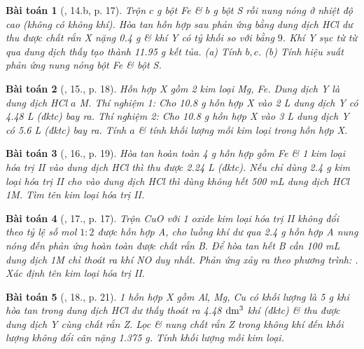 \documentclass{article}
\newtheorem{baitoan}{Bài toán}
\begin{document}
\begin{baitoan}[\cite{An_350_BT_Hoa_Hoc_9}, 14.b, p. 17]
	Trộn $c$ \emph{g} bột \emph{Fe} \& $b$ \emph{g} bột \emph{S} rồi nung nóng ở nhiệt độ cao (không có không khí). Hòa tan hỗn hợp sau phản ứng bằng dung dịch \emph{HCl} dư thu được chất rắn X nặng \emph{0.4 g} \& khí Y có tỷ khối so với \emph{} bằng $9$. Khí Y sục từ từ qua dung dịch \emph{} thấy tạo thành \emph{11.95 g} kết tủa. (a) Tính $b,c$. (b) Tính hiệu suất phản ứng nung nóng bột \emph{Fe} \& bột \emph{S}.
\end{baitoan}

\begin{baitoan}[\cite{An_350_BT_Hoa_Hoc_9}, 15., p. 18]
	Hỗn hợp X gồm 2 kim loại \emph{Mg, Fe}. Dung dịch Y là dung dịch \emph{HCl $a$ M}. Thí nghiệm 1: Cho \emph{10.8 g} hỗn hợp X vào \emph{2 L} dung dịch Y có \emph{4.48 L } (đktc) bay ra. Thí nghiệm 2: Cho \emph{10.8 g} hỗn hợp X vào \emph{3 L} dung dịch Y có \emph{5.6 L } (đktc) bay ra. Tính $a$ \& tính khối lượng mỗi kim loại trong hỗn hợp X.
\end{baitoan}

\begin{baitoan}[\cite{An_350_BT_Hoa_Hoc_9}, 16., p. 19]
	Hòa tan hoàn toàn \emph{4 g} hỗn hợp gồm \emph{Fe} \& 1 kim loại hóa trị II vào dung dịch \emph{HCl} thì thu được \emph{2.24 L } (đktc). Nếu chỉ dùng \emph{2.4 g} kim loại hóa trị II cho vào dung dịch \emph{HCl} thì dùng không hết \emph{500 mL} dung dịch \emph{HCl 1M}. Tìm tên kim loại hóa trị II.
\end{baitoan}

\begin{baitoan}[\cite{An_350_BT_Hoa_Hoc_9}, 17., p. 17]
	Trộn \emph{CuO} với 1 oxide kim loại hóa trị II không đổi theo tỷ lệ số mol $1:2$ được hỗn hợp A, cho luồng khí \emph{} dư qua \emph{2.4 g} hỗn hợp A nung nóng đến phản ứng hoàn toàn được chất rắn B. Để hòa tan hết B cần \emph{100 mL} dung dịch \emph{ 1M} chỉ thoát ra khí \emph{NO} duy nhất. Phản ứng xảy ra theo phương trình: \emph{}. Xác định tên kim loại hóa trị II.
\end{baitoan}

\begin{baitoan}[\cite{An_350_BT_Hoa_Hoc_9}, 18., p. 21]
	1 hỗn hợp X gồm \emph{Al, Mg, Cu} có khối lượng là \emph{5 g} khi hòa tan trong dung dịch \emph{HCl} dư thấy thoát ra \emph{4.48 $\rm dm^3$} khí (đktc) \& thu được dung dịch Y cùng chất rắn Z. Lọc \& nung chất rắn Z trong không khí đến khối lượng không đổi cân nặng \emph{1.375 g}. Tính khối lượng mỗi kim loại.
\end{baitoan}
\end{document}

